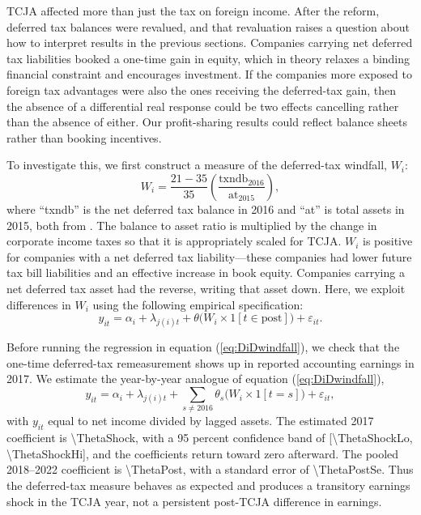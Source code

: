 \documentclass[11pt,letterpaper]{article}
\newcommand{\CoefNum}[1]{\num[round-mode=places,round-precision=3]{#1}}
\begin{document}
TCJA affected more than just the tax on foreign income.
After the reform, deferred tax balances were revalued, and that
revaluation raises a question about how to interpret results in the previous sections. Companies
carrying net deferred tax liabilities booked a one-time gain in equity,
which in theory relaxes a binding financial constraint and encourages
investment. If the companies more exposed to foreign tax advantages were also
the ones receiving the deferred-tax 
gain, then the absence of a differential real response could be two
effects cancelling rather than the absence of either. Our profit-sharing
results could reflect balance sheets rather than booking
incentives. 

To investigate this, we first construct a measure of the deferred-tax windfall, $W_i$:
\begin{equation*}
  W_i = \frac{21-35}{35}\left(\frac{\text{txndb}_{2016}}{\text{at}_{2015}}\right),
\end{equation*}
where ``txndb'' is the net deferred tax balance in 2016
and ``at'' is total assets in 2015, both from
\citet{CompustatAnnual}. 
The balance to asset ratio is multiplied by the change in corporate income
taxes so that it is appropriately scaled for TCJA.
$W_i$ is positive for companies with
a net deferred tax liability---these companies had
lower future tax bill liabilities and an effective increase in book equity.
Companies carrying a net deferred tax asset had the reverse, writing that
asset down.  Here, we exploit differences in $W_i$ using the following
empirical specification:
\begin{equation}
  y_{it} =
  \alpha_i+\lambda_{j(i)t}
  +\theta
  \bigl(W_i\times 1[t\in \text{post}]\bigr)
  +\varepsilon_{it}.
\label{eq:DiDwindfall}
\end{equation}

Before running the regression in equation (\ref{eq:DiDwindfall}), we check
that the one-time deferred-tax remeasurement shows up in
reported accounting earnings in 2017. We estimate the year-by-year analogue
of equation (\ref{eq:DiDwindfall}),
\begin{equation}
  y_{it} =
  \alpha_i+\lambda_{j(i)t}
  +\sum_{s\neq 2016}\theta_s
  \bigl(W_i\times 1[t=s]\bigr)
  +\varepsilon_{it},
\label{eq:FSwindfall}
\end{equation}
with $y_{it}$ equal to net income divided by lagged assets. The estimated
2017 coefficient is \CoefNum{\ThetaShock}, with a 95 percent confidence band
of [\CoefNum{\ThetaShockLo}, \CoefNum{\ThetaShockHi}], and the coefficients
return toward zero afterward. The pooled 2018--2022 coefficient is
\CoefNum{\ThetaPost}, with a standard error of \CoefNum{\ThetaPostSe}.
Thus the deferred-tax measure behaves as expected and produces a transitory
earnings shock in the TCJA year, not a persistent post-TCJA difference in
earnings.
\end{document}
